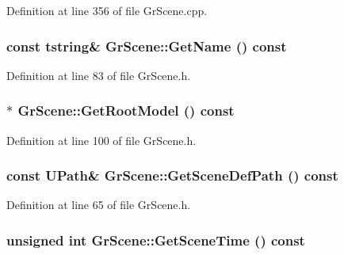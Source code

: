 Definition at line 356 of file GrScene.cpp.\hypertarget{class_gr_scene_e7530eaa5692d6eecde9b90d14ff6639}{
\subsubsection[{GetName}]{\setlength{\rightskip}{0pt plus 5cm}const {\bf tstring}\& GrScene::GetName () const}}
\label{class_gr_scene_e7530eaa5692d6eecde9b90d14ff6639}




Definition at line 83 of file GrScene.h.\hypertarget{class_gr_scene_77053ce45ce06b5253e28c63660bbe20}{
\subsubsection[{GetRootModel}]{$\ast$ GrScene::GetRootModel () const}}
\label{class_gr_scene_77053ce45ce06b5253e28c63660bbe20}




Definition at line 100 of file GrScene.h.\hypertarget{class_gr_scene_3553093b4916089dbba484029cba2d11}{
\subsubsection[{GetSceneDefPath}]{\setlength{\rightskip}{0pt plus 5cm}const {\bf UPath}\& GrScene::GetSceneDefPath () const}}
\label{class_gr_scene_3553093b4916089dbba484029cba2d11}




Definition at line 65 of file GrScene.h.\hypertarget{class_gr_scene_38c11228869fe18212a2e9828d7664bb}{
\subsubsection[{GetSceneTime}]{\setlength{\rightskip}{0pt plus 5cm}unsigned int GrScene::GetSceneTime () const}}
\label{class_gr_scene_38c11228869fe18212a2e9828d7664bb}




